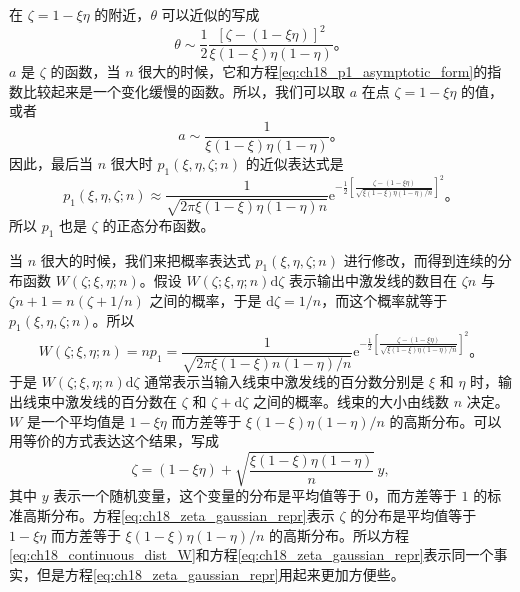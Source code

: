 在 $\zeta=1-\xi\eta$ 的附近，$\theta$ 可以近似的写成
\begin{equation}
\theta \sim \frac{1}{2}\frac{[\zeta-(1-\xi\eta)]^2}{\xi(1-\xi)\eta(1-\eta)}。
\label{eq:ch18_theta_quadratic_approx}
\end{equation}
$a$ 是 $\zeta$ 的函数，当 $n$ 很大的时候，它和方程\eqref{eq:ch18_p1_asymptotic_form}的指数比较起来是一个变化缓慢的函数。所以，我们可以取 $a$ 在点 $\zeta=1-\xi\eta$ 的值，或者
\begin{equation}
a \sim \frac{1}{\xi(1-\xi)\eta(1-\eta)}。
\label{eq:ch18_a_approx_at_min}
\end{equation}
因此，最后当 $n$ 很大时 $p_1(\xi,\eta,\zeta;n)$ 的近似表达式是
\begin{equation}
p_1(\xi,\eta,\zeta;n) \approx \frac{1}{\sqrt{2\pi\xi(1-\xi)\eta(1-\eta)n}} \mathrm{e}^{-\frac{1}{2}\left[\frac{\zeta-(1-\xi\eta)}{\sqrt{\xi(1-\xi)\eta(1-\eta)/n}}\right]^2}。
\label{eq:ch18_p1_gaussian_approx_final}
\end{equation}
所以 $p_1$ 也是 $\zeta$ 的正态分布函数。

当 $n$ 很大的时候，我们来把概率表达式 $p_1(\xi,\eta,\zeta;n)$ 进行修改，而得到连续的分布函数 $W(\zeta;\xi,\eta;n)$。假设 $W(\zeta;\xi,\eta;n)\mathrm{d}\zeta$ 表示输出中激发线的数目在 $\zeta n$ 与 $\zeta n+1=n(\zeta+1/n)$ 之间的概率，于是 $\mathrm{d}\zeta=1/n$，而这个概率就等于 $p_1(\xi,\eta,\zeta;n)$。所以
\begin{equation}
W(\zeta;\xi,\eta;n) = n p_1 = \frac{1}{\sqrt{2\pi\xi(1-\xi)n(1-\eta)/n}} \mathrm{e}^{-\frac{1}{2}\left[\frac{\zeta-(1-\xi\eta)}{\sqrt{\xi(1-\xi)\eta(1-\eta)/n}}\right]^2}。
\label{eq:ch18_continuous_dist_W}
\end{equation}
于是 $W(\zeta;\xi,\eta;n)\mathrm{d}\zeta$ 通常表示当输入线束中激发线的百分数分别是 $\xi$ 和 $\eta$ 时，输出线束中激发线的百分数在 $\zeta$ 和 $\zeta+\mathrm{d}\zeta$ 之间的概率。线束的大小由线数 $n$ 决定。$W$ 是一个平均值是 $1-\xi\eta$ 而方差等于 $\xi(1-\xi)\eta(1-\eta)/n$ 的高斯分布。可以用等价的方式表达这个结果，写成
\begin{equation}
\zeta = (1-\xi\eta) + \sqrt{\frac{\xi(1-\xi)\eta(1-\eta)}{n}}\,y,
\label{eq:ch18_zeta_gaussian_repr}
\end{equation}
其中 $y$ 表示一个随机变量，这个变量的分布是平均值等于 $0$，而方差等于 $1$ 的标准高斯分布。方程\eqref{eq:ch18_zeta_gaussian_repr}表示 $\zeta$ 的分布是平均值等于 $1-\xi\eta$ 而方差等于 $\xi(1-\xi)\eta(1-\eta)/n$ 的高斯分布。所以方程\eqref{eq:ch18_continuous_dist_W}和方程\eqref{eq:ch18_zeta_gaussian_repr}表示同一个事实，但是方程\eqref{eq:ch18_zeta_gaussian_repr}用起来更加方便些。


